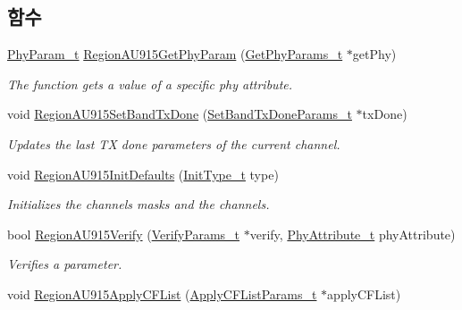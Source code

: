 \subsection*{함수}
\begin{DoxyCompactItemize}
\item 
\mbox{\hyperlink{group___r_e_g_i_o_n_gaed159b26e5c4677236b6e8677019db30}{Phy\+Param\+\_\+t}} \mbox{\hyperlink{group___r_e_g_i_o_n_a_u915_ga91322f6f4dc9d6155316edd4dc198830}{Region\+A\+U915\+Get\+Phy\+Param}} (\mbox{\hyperlink{group___r_e_g_i_o_n_gab471483fff904f4f89bbc03f7fc380ab}{Get\+Phy\+Params\+\_\+t}} $\ast$get\+Phy)
\begin{DoxyCompactList}\small\item\em The function gets a value of a specific phy attribute. \end{DoxyCompactList}\item 
void \mbox{\hyperlink{group___r_e_g_i_o_n_a_u915_ga612ca919a6dcb846f32080a89d3824d7}{Region\+A\+U915\+Set\+Band\+Tx\+Done}} (\mbox{\hyperlink{group___r_e_g_i_o_n_gad0524aa0673c0814a71e7a4f9cade3fc}{Set\+Band\+Tx\+Done\+Params\+\_\+t}} $\ast$tx\+Done)
\begin{DoxyCompactList}\small\item\em Updates the last TX done parameters of the current channel. \end{DoxyCompactList}\item 
void \mbox{\hyperlink{group___r_e_g_i_o_n_a_u915_gaf061a05f766feb06e67da3377638034a}{Region\+A\+U915\+Init\+Defaults}} (\mbox{\hyperlink{group___r_e_g_i_o_n_gaddc73ae10673ec925724e7870363bda9}{Init\+Type\+\_\+t}} type)
\begin{DoxyCompactList}\small\item\em Initializes the channels masks and the channels. \end{DoxyCompactList}\item 
bool \mbox{\hyperlink{group___r_e_g_i_o_n_a_u915_ga728e3b1cdcd99b88a8c923c9fd0fd9a4}{Region\+A\+U915\+Verify}} (\mbox{\hyperlink{group___r_e_g_i_o_n_ga966d97bc2f25df1c09e92e60ef652276}{Verify\+Params\+\_\+t}} $\ast$verify, \mbox{\hyperlink{group___r_e_g_i_o_n_ga9445b07fdf77581ecfaf389970e635f8}{Phy\+Attribute\+\_\+t}} phy\+Attribute)
\begin{DoxyCompactList}\small\item\em Verifies a parameter. \end{DoxyCompactList}\item 
void \mbox{\hyperlink{group___r_e_g_i_o_n_a_u915_ga4fd62616137cb73c9fc38f0854e6dad9}{Region\+A\+U915\+Apply\+C\+F\+List}} (\mbox{\hyperlink{group___r_e_g_i_o_n_ga71588e9ad07e34b78fa91d51881fd3c6}{Apply\+C\+F\+List\+Params\+\_\+t}} $\ast$apply\+C\+F\+List)

\end{DoxyCompactItemize}
